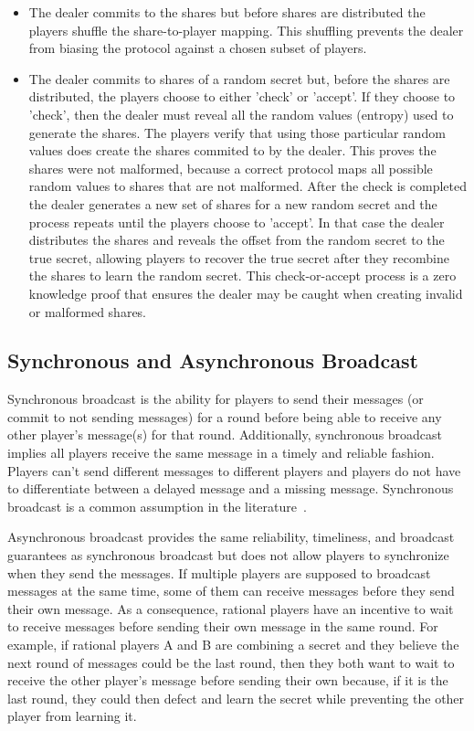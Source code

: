 \documentclass[12pt]{dalcsthesis}
\begin{document}
\begin{itemize}
  \item The dealer commits to the shares but before shares are distributed the players shuffle the share-to-player mapping. This shuffling prevents the dealer from biasing the protocol against a chosen subset of players.  
  \item The dealer commits to shares of a random secret but, before the shares are distributed, the players choose to either 'check' or 'accept'. If they choose to 'check', then the dealer must reveal all the random values (entropy) used to generate the shares. The players verify that using those particular random values does create the shares commited to by the dealer. This proves the shares were not malformed, because a correct protocol maps all possible random values to shares that are not malformed. After the check is completed the dealer generates a new set of shares for a new random secret and the process repeats until the players choose to 'accept'. In that case the dealer distributes the shares and reveals the offset from the random secret to the true secret, allowing players to recover the true secret after they recombine the shares to learn the random secret. This check-or-accept process is a zero knowledge proof that ensures the dealer may be caught when creating invalid or malformed shares. 
\end{itemize}

\subsection{Synchronous and Asynchronous Broadcast}
\label{Def:Broadcast}

Synchronous broadcast is the ability for players to send their messages (or commit to not sending messages) for a round before being able to receive any other player's message(s) for that round. Additionally, synchronous broadcast implies all players receive the same message in a timely and reliable fashion. Players can't send different messages to different players and players do not have to differentiate between a delayed message and a missing message. Synchronous broadcast is a common assumption in the literature~\cite{fuch10, gordon06, halpern04, kol08-2, kol08, maleka08, ong09}.

Asynchronous broadcast provides the same reliability, timeliness, and broadcast guarantees as synchronous broadcast but does not allow players to synchronize when they send the messages. If multiple players are supposed to broadcast messages at the same time, some of them can receive messages before they send their own message. As a consequence, rational players have an incentive to wait to receive messages before sending their own message in the same round. For example, if rational players A and B are combining a secret and they believe the next round of messages could be the last round, then they both want to wait to receive the other player's message before sending their own because, if it is the last round, they could then defect and learn the secret while preventing the other player from learning it.
\end{document}
